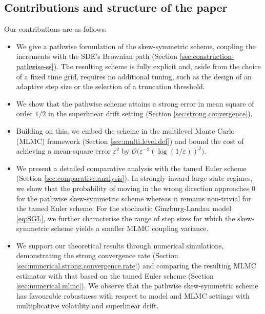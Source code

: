 \documentclass[11pt]{article}
\begin{document}
\subsection{Contributions and structure of the paper}
Our contributions are as follows:
\begin{itemize}[leftmargin=0.5cm]
% 
\item We give a pathwise formulation of the skew-symmetric scheme, coupling the increments with the SDE's Brownian path (Section \ref{sec:construction-pathwise-ss}). The resulting scheme is fully explicit and, aside from the choice of a fixed time grid, requires no additional tuning, such as the design of an adaptive step size or the selection of a truncation threshold. 
\item We show that the pathwise scheme attains a strong error in mean square of order $1/2$ in the superlinear drift setting (Section \ref{sec:strong.convergence}).
% 
\item Building on this, we embed the scheme in the multilevel Monte Carlo (MLMC) framework (Section \ref{sec:multi.level.def}) and bound the cost of achieving a mean-square error $\varepsilon^2$ by $\mathcal{O} \bigl(\varepsilon^{-2} (\log (1 /  \varepsilon) )^2 \bigr)$.
% 
\item We present a detailed comparative analysis with the tamed Euler scheme (Section \ref{sec:comparative.analysis}). In strongly inward large state regimes, we show that the probability of moving in the wrong direction approaches $0$ for the pathwise skew-symmetric scheme whereas it remains non-trivial for the tamed Euler scheme. For the stochastic Ginzburg-Landau model \eqref{eq:SGL}, we further characterise the range of step sizes for which the skew-symmetric scheme yields a smaller MLMC coupling variance.

\item We support our theoretical results through numerical simulations, demonstrating the strong convergence rate (Section \ref{sec:numerical.strong.convergence.rate}) and comparing the resulting MLMC estimator with that based on the tamed Euler scheme (Section \ref{sec:numerical.mlmc}). We observe that the pathwise skew-symmetric scheme has favourable robustness with respect to model and MLMC settings with multiplicative volatility and superlinear drift.

\end{itemize}
\end{document}
